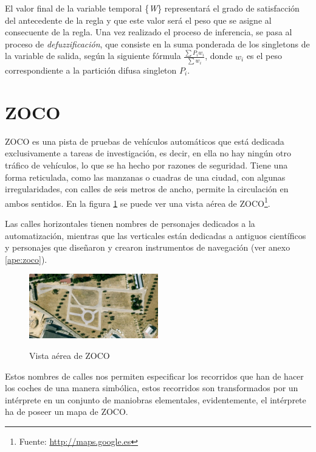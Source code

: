 El valor final de la variable temporal \{\textit{W}\} representará el grado de satisfacción del antecedente de la regla y que este valor será el peso que se asigne al consecuente de la regla. Una vez realizado el proceso de inferencia, se pasa al proceso de \textit{defuzzificación}, que consiste en la suma ponderada de los singletons de la variable de salida, según la siguiente fórmula $\frac{\sum P_{i}w_{i}}{\sum w_{i}}$,
donde $w_{i}$ es el peso correspondiente a la partición difusa singleton $P_{i}$.


\section{ZOCO}
\label{sec:zoco}

\gls{ZOCO} es una pista de pruebas de vehículos automáticos que está dedicada exclusivamente a tareas de
investigación, es decir, en ella no hay ningún otro tráfico de vehículos, lo que se ha hecho por razones de seguridad. Tiene una
forma reticulada, como las manzanas o cuadras de una ciudad, con algunas irregularidades, con calles de seis metros de ancho,
permite la circulación en ambos sentidos. En la figura \ref{fig:zoco} se puede ver una vista aérea de \gls{ZOCO}\footnote{Fuente: \url{http://maps.google.es}}.

Las calles horizontales tienen nombres de personajes dedicados a la automatización, mientras que las verticales están dedicadas a antiguos científicos y personajes que diseñaron y crearon instrumentos de navegación (ver anexo \ref{ape:zoco}).

\begin{figure}[h]
  \centering
  \includegraphics[width=0.5\textwidth]{figures/zoco.png}
  \label{zoco}
  \caption{Vista aérea de ZOCO}
  \label{fig:zoco}
\end{figure}

Estos nombres de calles nos permiten especificar los recorridos que han de hacer los coches de una manera simbólica, estos recorridos son transformados por un intérprete en un conjunto de maniobras elementales, evidentemente, el intérprete ha de poseer un mapa de \gls{ZOCO}.

